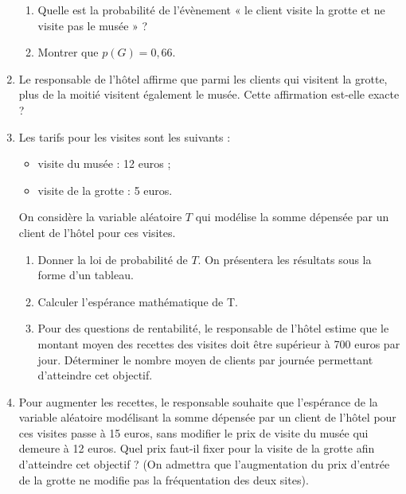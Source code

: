 \documentclass[11pt,fleqn, openany]{book} %
\begin{document}
\begin{exercise}[subtitle={(Métropole 2022)}]
\begin{enumerate}
\begin{enumerate}
\item Quelle est la probabilité de l'évènement
« le client visite la grotte et ne visite pas
le musée » ?
\item Montrer que $p(G) = 0,66$.
\end{enumerate}
\item Le responsable de l'hôtel affirme que parmi les clients qui visitent la grotte, plus de la moitié
visitent également le musée. Cette affirmation est-elle exacte ?
\item Les tarifs pour les visites sont les suivants :
\begin{itemize}
\item visite du musée : 12 euros ;
\item visite de la grotte : 5 euros.\end{itemize}
On considère la variable aléatoire $T$ qui modélise la somme dépensée par un client de l'hôtel pour ces visites.
\begin{enumerate}
\item Donner la loi de probabilité de $T$. On présentera les résultats sous la forme d'un tableau.
\item Calculer l'espérance mathématique de T.
\item Pour des questions de rentabilité, le responsable de l'hôtel estime que le montant
moyen des recettes des visites doit être supérieur à 700 euros par jour.
Déterminer le nombre moyen de clients par journée permettant d'atteindre cet objectif.\end{enumerate}
\item Pour augmenter les recettes, le responsable souhaite que l'espérance de la variable aléatoire modélisant la somme dépensée par un client de l'hôtel pour ces visites passe à 15 euros, sans modifier le prix de visite du musée qui demeure à 12 euros.
Quel prix faut-il fixer pour la visite de la grotte afin d'atteindre cet objectif ? (On admettra
que l'augmentation du prix d'entrée de la grotte ne modifie pas la fréquentation des deux
sites).\end{enumerate}\end{exercise}
\end{document}
